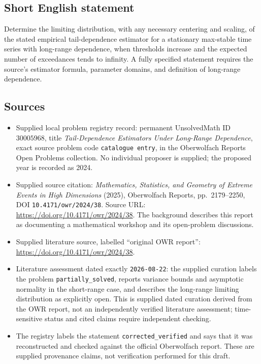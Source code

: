 \documentclass[11pt]{article}
\begin{document}
\subsection{Short English statement}
Determine the limiting distribution, with any necessary centering and scaling, of the stated empirical tail-dependence estimator for a stationary max-stable time series with long-range dependence, when thresholds increase and the expected number of exceedances tends to infinity. A fully specified statement requires the source's estimator formula, parameter domains, and definition of long-range dependence.
\subsection{Sources}
\begin{itemize}
\item Supplied local problem registry record: permanent UnsolvedMath ID \(30005968\), title \emph{Tail-Dependence Estimators Under Long-Range Dependence}, exact source problem code \texttt{catalogue entry}, in the Oberwolfach Reports Open Problems collection. No individual proposer is supplied; the proposed year is recorded as 2024.
\item Supplied source citation: \emph{Mathematics, Statistics, and Geometry of Extreme Events in High Dimensions} (2025), Oberwolfach Reports, pp.\ 2179--2250, DOI \texttt{10.4171/owr/2024/38}. Source URL: \url{https://doi.org/10.4171/owr/2024/38}. The background describes this report as documenting a mathematical workshop and its open-problem discussions.
\item Supplied literature source, labelled ``original OWR report'': \url{https://doi.org/10.4171/owr/2024/38}.
\item Literature assessment dated exactly \texttt{2026-08-22}: the supplied curation labels the problem \texttt{partially\_solved}, reports variance bounds and asymptotic normality in the short-range case, and describes the long-range limiting distribution as explicitly open. This is supplied dated curation derived from the OWR report, not an independently verified literature assessment; time-sensitive status and cited claims require independent checking.
\item The registry labels the statement \texttt{corrected\_verified} and says that it was reconstructed and checked against the official Oberwolfach report. These are supplied provenance claims, not verification performed for this draft.
\end{itemize}
\end{document}
